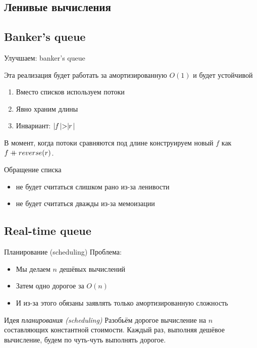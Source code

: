 \subsection{Ленивые вычисления}


\subsection{Banker's queue}

\begin{frame}{Улучшаем: banker's queue}
\begin{remark}
Эта реализация будет работать за амортизированную $O(1)$ и будет устойчивой
\end{remark}


\begin{enumerate}
\item Вместо списков используем потоки 
\item Явно храним длины
\item Инвариант: $\mid\!\!f\!\mid>\mid\!\!r\!\mid$
\end{enumerate}
\vspace{1em}

В момент, когда потоки сравняются под длине конструируем новый $f$ как $f \mathbin{+\mkern-10mu+} reverse(r)$. \vspace{1em}

Обращение списка 
\begin{itemize}
\item не будет считаться слишком рано из-за ленивости
\item не будет считаться дважды из-за мемоизации
\end{itemize}
\end{frame}


\subsection{Real-time queue}
\begin{frame}{Планирование (scheduling)}
Проблема:
\begin{itemize}
\item Мы делаем $n$ дешёвых вычислений
\item Затем одно дорогое за $O(n)$
\item И из-за этого обязаны заявлять только амортизированную сложность
\end{itemize}

\begin{block}{Идея \emph{планирования (scheduling)}}
Разобьём дорогое вычисление на $n$ составляющих константной стоимости. Каждый раз, выполняя дешёвое вычисление, будем по чуть-чуть выполнять дорогое.
\end{block}
\end{frame}

